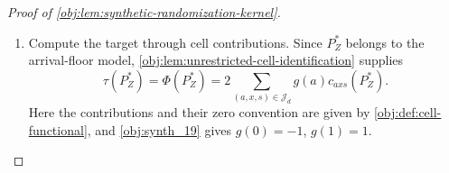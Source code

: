 \documentclass[11pt]{article}
\begin{document}
\begin{proof}[Proof of \cref{obj:lem:synthetic-randomization-kernel}]
\begin{enumerate}
For a deterministic input sample
\[
\mathbf z=((x_i,b_i,y_i))_{i=1}^n
\in\bigl(\{1,\ldots,d\}\times\{0,1\}^2\bigr)^n
\]
and \(\mathbf u=(u_i)_{i=1}^n\in\{0,1\}^n\), define
\[
\mathsf o_n(\mathbf z,\mathbf u)
:=
\bigl(o(x_i,b_i,y_i;u_i)\bigr)_{i=1}^n,
\qquad
\kappa_{\mathrm{syn},n}(\mathbf z,\cdot)
:=
\bigotimes_{i=1}^n
\kappa_{\mathrm{syn}}\bigl((x_i,b_i,y_i),\cdot\bigr).
\]
Independent fair draws give
\[
\kappa_{\mathrm{syn},n}(\mathbf z,\cdot)
=
\bigl(\mathsf o_n(\mathbf z,\cdot)\bigr)_{\#}
\nu_{\mathrm{coin}}^{\otimes n},
\]
where the subscript \(\#\) denotes pushforward. Integrating over the input sample, regrouping the product coordinates into record--coin pairs, and then applying the record map coordinatewise gives
\[
\begin{aligned}
\int\kappa_{\mathrm{syn},n}(\mathbf z,\cdot)\,
P_Z^{\otimes n}(d\mathbf z)
&=
(\mathsf o_n)_{\#}
\bigl(P_Z^{\otimes n}\otimes\nu_{\mathrm{coin}}^{\otimes n}\bigr)\\
&=
\bigotimes_{i=1}^n
\left[
\int\kappa_{\mathrm{syn}}\bigl((x,b,y),\cdot\bigr)\,
P_Z(d(x,b,y))
\right]\\
&=
\nu_{\mathrm{obs}}^{\otimes n}.
\end{aligned}
\]
The regrouping is justified by the product identity
\[
\left(\prod_{i=1}^nP_Z(dz_i)\right)
\left(\prod_{i=1}^n\nu_{\mathrm{coin}}(du_i)\right)
=
\prod_{i=1}^n
\left(P_Z(dz_i)\nu_{\mathrm{coin}}(du_i)\right),
\]
and coordinatewise pushforward preserves this product form. Thus the kernel produces exactly the observed product law identified in the preceding step, and its output satisfies \cref{obj:ass:iid-sampling}.

\item Compute the target through cell contributions. Since \(P_Z^*\) belongs to the arrival-floor model, \cref{obj:lem:unrestricted-cell-identification} supplies
\[
\tau(P_Z^*)=\Phi(P_Z^*)
=
2\sum_{(a,x,s)\in\mathcal J_d}g(a)c_{axs}(P_Z^*).
\]
Here the contributions and their zero convention are given by \cref{obj:def:cell-functional}, and \cref{obj:synth_19} gives \(g(0)=-1\), \(g(1)=1\).


\end{enumerate}
\end{proof}
\end{document}
